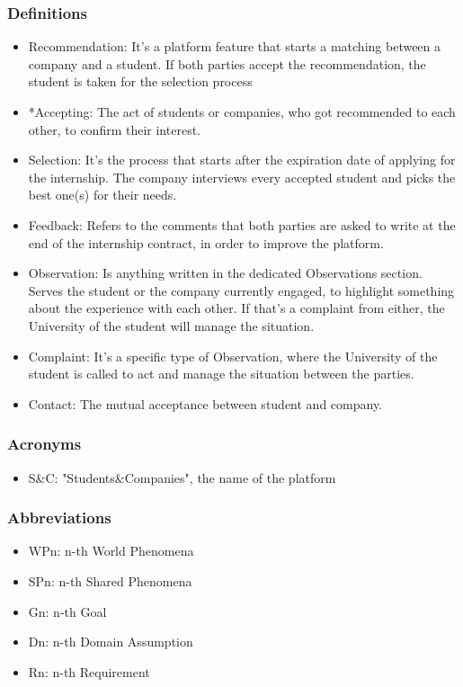 \documentclass{article}
\begin{document}
\subsubsection{Definitions}
    \begin{itemize}
        \item Recommendation: It's a platform feature that starts a matching between a company and a student. If both parties accept the recommendation, the student is taken for the selection process
        \item *Accepting: The act of students or companies, who got recommended to each other, to confirm their interest. 
        \item Selection: It's the process that starts after the expiration date of applying for the internship. The company interviews every accepted student and picks the best one(s) for their needs. 
        \item Feedback: Refers to the comments that both parties are asked to write at the end of the internship contract, in order to improve the platform.
        \item Observation: Is anything written in the dedicated Observations section. Serves the student or the company currently engaged, to highlight something about the experience with each other. If that's a complaint from either, the University of the student will manage the situation.
        \item Complaint: It's a specific type of Observation, where the University of the student is called to act and manage the situation between the parties.
        \item Contact: The mutual acceptance between student and company.
    \end{itemize}
\subsubsection{Acronyms}
    \begin{itemize}
        \item S\&C: "Students&Companies", the name of the platform
    \end{itemize}
\subsubsection{Abbreviations}
    \begin{itemize}
        \item WPn: n-th World Phenomena
        \item SPn: n-th Shared Phenomena
        \item Gn: n-th Goal
        \item Dn: n-th Domain Assumption
        \item Rn: n-th Requirement
    \end{itemize}
\end{document}
